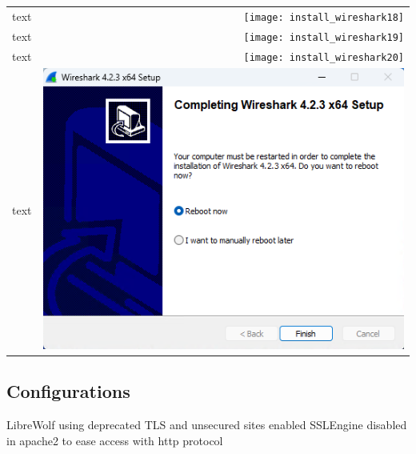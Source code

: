 \documentclass[11pt,a4paper]{report}
\begin{document}
\begin{tabular}{ l r }
            text & \texttt{[image: install\_wireshark18]} \\
            text & \texttt{[image: install\_wireshark19]} \\
            text & \texttt{[image: install\_wireshark20]} \\
            text & \includegraphics[scale=1.0]{install_wireshark21} \\
        \end{tabular}

    \subsection{Configurations}
        LibreWolf using deprecated TLS and unsecured sites enabled
        SSLEngine disabled in apache2 to ease access with http protocol
        
\end{document}
